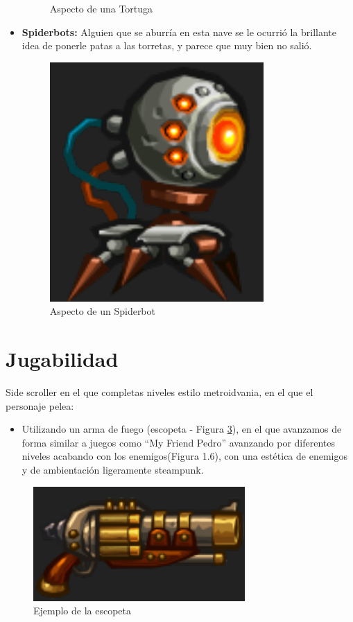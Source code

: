 \begin{itemize}
\begin{figure}[H]
		\caption{\label{fig:Tortuga}Aspecto de una Tortuga}
	\end{figure}
	\newpage
	\item \textbf{Spiderbots:} Alguien que se aburría en esta nave se le ocurrió la brillante idea de ponerle patas a las torretas, y parece que muy bien no salió. 
	\begin{figure}[H]
		\centering
		\includegraphics[scale=0.6]{imagenes/spiderbot.png}	
		\caption{\label{fig:Spiderbots}Aspecto de un Spiderbot}
	\end{figure}
\end{itemize}

\section{Jugabilidad}
Side scroller en el que completas niveles estilo metroidvania, en el que el 
personaje pelea:  
\begin{itemize}
	\item Utilizando un arma de fuego (escopeta - Figura \ref{fig:escopeta}),
	 en el que avanzamos de forma similar a juegos como “My Friend Pedro”
	   avanzando por diferentes niveles acabando con los enemigos(Figura 1.6),
	    con una estética de enemigos y de ambientación ligeramente steampunk.
\end{itemize}
\begin{figure}[H]
	\centering
	\includegraphics[scale=0.80]{imagenes/escopeta.png}	
	\caption{\label{fig:escopeta}Ejemplo de la escopeta}
\end{figure}

